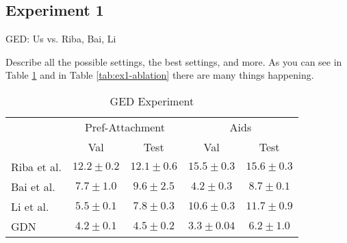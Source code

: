 \subsection{Experiment 1}

GED: Us vs. Riba, Bai, Li

Describe all the possible settings, the best settings, and more. As you can see in Table \ref{tab:ex1-baselines} and in Table \ref{tab:ex1-ablation} there are many things happening.


\begin{table}[htbp]
    \addtolength{\tabcolsep}{-1pt}
    \fontsize{9pt}{10.25pt}\selectfont
    \centering
    \renewcommand{\arraystretch}{1.2}
    \begin{tabular}{|l|c|c|c|c|}
        \hline
        \multirow{2}{*}{} & \multicolumn{2}{c|}{Pref-Attachment} & \multicolumn{2}{c|}{Aids} \\ \hhline{|~|-|-|-|-|}
        & Val & Test & Val & Test \\ \hhline{|=|=|=|=|=|}
        Riba et al. & $12.2 \pm 0.2$ & $12.1 \pm 0.6$ & $15.5 \pm 0.3$  & $15.6 \pm 0.3$ \\ \hline
        Bai et al. & $7.7 \pm 1.0$ & $9.6 \pm 2.5$ & $4.2 \pm 0.3$ & $8.7 \pm 0.1$ \\ \hline
        Li et al. & $5.5 \pm 0.1 $ & $7.8 \pm 0.3$ & $10.6 \pm 0.3$ & $11.7 \pm 0.9$ \\ \hline
        GDN & $4.2 \pm 0.1$ & $\boldsymbol{4.5 \pm 0.2}$ & $3.3 \pm 0.04$ & $\boldsymbol{6.2 \pm 1.0}$ \\ \hline
    \end{tabular}
    \caption{GED Experiment}
    \label{tab:ex1-baselines}
\end{table}


